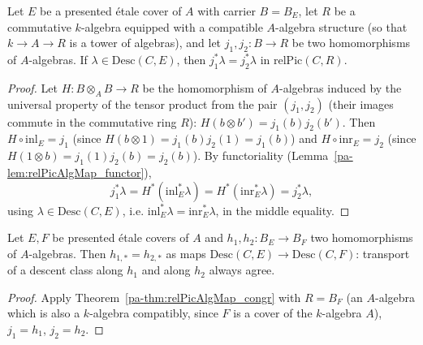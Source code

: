 \begin{theorem}
  \label{pa-thm:relPicAlgMap_congr}
  \leanok

  Let \(E\) be a presented \'etale cover of \(A\) with carrier \(B = B_E\), let \(R\) be a
  commutative \(k\)-algebra equipped with a compatible \(A\)-algebra structure (so that
  \(k \to A \to R\) is a tower of algebras), and let \(j_1, j_2 \colon B \to R\) be two
  homomorphisms of \(A\)-algebras. If \(\lambda \in \mathrm{Desc}(C,E)\), then
  \(j_1^{*}\lambda = j_2^{*}\lambda\) in \(\mathrm{relPic}(C,R)\).
\end{theorem}
\begin{proof}
  \leanok
  Let \(H \colon B \otimes_A B \to R\) be the homomorphism of \(A\)-algebras induced by the
  universal property of the tensor product from the pair \((j_1, j_2)\) (their images commute
  in the commutative ring \(R\)): \(H(b \otimes b') = j_1(b) j_2(b')\). Then
  \(H \circ \mathrm{inl}_E = j_1\) (since \(H(b \otimes 1) = j_1(b) j_2(1) = j_1(b)\)) and
  \(H \circ \mathrm{inr}_E = j_2\) (since \(H(1 \otimes b) = j_1(1) j_2(b) = j_2(b)\)). By
  functoriality (Lemma~\ref{pa-lem:relPicAlgMap_functor}),
  \[
    j_1^{*}\lambda = H^{*}(\mathrm{inl}_E^{*}\lambda) = H^{*}(\mathrm{inr}_E^{*}\lambda)
    = j_2^{*}\lambda,
  \]
  using \(\lambda \in \mathrm{Desc}(C,E)\), i.e. \(\mathrm{inl}_E^{*}\lambda =
  \mathrm{inr}_E^{*}\lambda\), in the middle equality.
\end{proof}

\begin{theorem}
  \label{pa-thm:descentMap_congr}
  \leanok

  Let \(E, F\) be presented \'etale covers of \(A\) and \(h_1, h_2 \colon B_E \to B_F\) two
  homomorphisms of \(A\)-algebras. Then \(h_{1,*} = h_{2,*}\) as maps
  \(\mathrm{Desc}(C,E) \to \mathrm{Desc}(C,F)\): transport of a descent class along \(h_1\) and
  along \(h_2\) always agree.
\end{theorem}
\begin{proof}
  \leanok
  Apply Theorem~\ref{pa-thm:relPicAlgMap_congr} with \(R = B_F\) (an \(A\)-algebra which is also a
  \(k\)-algebra compatibly, since \(F\) is a cover of the \(k\)-algebra \(A\)), \(j_1 = h_1\),
  \(j_2 = h_2\).
\end{proof}

